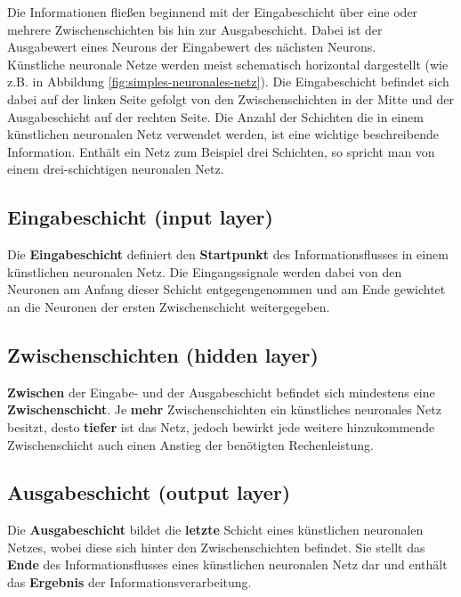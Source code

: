 Die Informationen fließen beginnend mit der Eingabeschicht über eine oder mehrere Zwischenschichten bis hin zur Ausgabeschicht. Dabei ist der Ausgabewert eines Neurons der Eingabewert des nächsten Neurons. \cite{jaai} \\

Künstliche neuronale Netze werden meist schematisch horizontal dargestellt (wie z.B. in Abbildung \ref{fig:simples-neuronales-netz}). Die Eingabeschicht befindet sich dabei auf der linken Seite  gefolgt von den Zwischenschichten in der Mitte und der Ausgabeschicht auf der rechten Seite.
Die Anzahl der Schichten die in einem künstlichen neuronalen Netz verwendet werden, ist eine wichtige beschreibende Information. Enthält ein Netz zum Beispiel drei Schichten, so spricht man von einem drei-schichtigen neuronalen Netz. \cite{jaai}

\subsection{Eingabeschicht (input layer)}
	
	Die \textbf{Eingabeschicht} definiert den \textbf{Startpunkt} des Informationsflusses in einem künstlichen neuronalen Netz. Die Eingangssignale werden dabei von den Neuronen am Anfang dieser Schicht entgegengenommen und am Ende gewichtet an die Neuronen der ersten Zwischenschicht weitergegeben. \cite{jaai}
	
\subsection{Zwischenschichten (hidden layer)}

	\textbf{Zwischen} der Eingabe- und der Ausgabeschicht befindet sich mindestens eine \textbf{Zwischenschicht}. Je \textbf{mehr} Zwischenschichten ein künstliches neuronales Netz besitzt, desto \textbf{tiefer} ist das Netz, jedoch bewirkt jede weitere hinzukommende Zwischenschicht auch einen Anstieg der benötigten Rechenleistung. \cite{jaai}
	
\subsection{Ausgabeschicht (output layer)}

	Die \textbf{Ausgabeschicht} bildet die \textbf{letzte} Schicht eines künstlichen neuronalen Netzes, wobei diese sich hinter den Zwischenschichten befindet. Sie stellt das \textbf{Ende} des Informationsflusses eines künstlichen neuronalen Netz dar und enthält das \textbf{Ergebnis} der Informationsverarbeitung. \cite{jaai}
	
